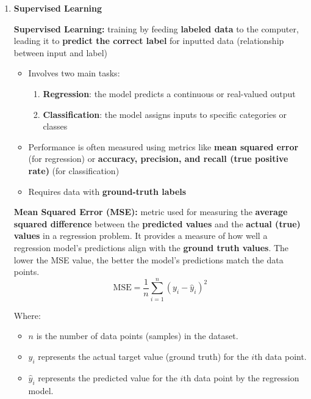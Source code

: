\begin{enumerate}
    \item \textbf{Supervised Learning}
\begin{definition}
    \textbf{Supervised Learning:} training by feeding \textbf{labeled data} to the computer, leading it to \textbf{predict the correct label} for inputted data (relationship between input and label)
\end{definition}
\begin{itemize}
\item Involves two main tasks: 
\begin{enumerate}
    \item \textbf{Regression}: the model predicts a continuous or real-valued output
    \item \textbf{Classification}: the model assigns inputs to specific categories or classes
\end{enumerate}
\item Performance is often measured using metrics like \textbf{mean squared error} (for regression) or \textbf{accuracy, precision, and recall (true positive rate) }(for classification)
\item Requires data with \textbf{ground-truth labels}
\end{itemize}
\begin{definition}

            \textbf{Mean Squared Error (MSE):} metric used for measuring the \textbf{average squared difference} between the \textbf{predicted values} and the \textbf{actual (true) values} in a regression problem. It provides a measure of how well a regression model's predictions align with the \textbf{ground truth values}. The lower the MSE value, the better the model's predictions match the data points.\\

\[ \text{MSE} = \frac{1}{n} \sum_{i=1}^{n} (y_i - \hat{y}_i)^2 \]

Where:
\begin{itemize}
\item  \( n \) is the number of data points (samples) in the dataset.
\item \( y_i \) represents the actual target value (ground truth) for the \( i \)th data point.
\item \( \hat{y}_i \) represents the predicted value for the \( i \)th data point by the regression model.
\end{itemize}
\end{definition}


\end{enumerate}
